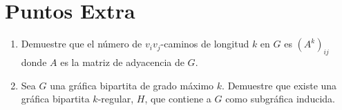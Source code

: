 \documentclass{article}
\begin{document}
\section*{Puntos Extra}
\begin{enumerate}
\item Demuestre que el n\'umero de $v_i v_j$-caminos de longitud $k$ en $G$ es
  $(A^k)_{ij}$ donde $A$ es la matriz de adyacencia de $G$.
\item Sea $G$ una gr\'afica bipartita de grado m\'aximo $k$.   Demuestre que
  existe una gr\'afica bipartita $k$-regular, $H$, que contiene a $G$ como
  subgr\'afica inducida.
\end{enumerate}
\end{document}

